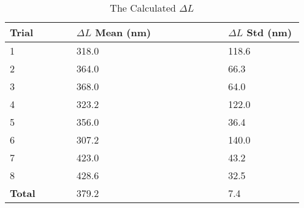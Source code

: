 \begin{table}[htbp]
\centering
\caption{The Calculated $\Delta L$} 
\label{tab:fsr}
\begin{tabular}{|p{0.22\linewidth}|p{0.5\linewidth}|p{0.25\linewidth}|}
\hline
\textbf{Trial}
&
\textbf{$\Delta L$ Mean (nm)}
&
\textbf{$\Delta L$ Std (nm)}
\\
\hline
1
&
318.0
&
118.6
\\
\hline
2
&
364.0
&
66.3
\\
\hline
3
&
368.0
&
64.0
\\
\hline 
4
&
323.2
&
122.0
\\
\hline 
5
&
356.0
&
36.4
\\
\hline 
6
&
307.2
&
140.0
\\
\hline 
7
&
423.0
&
43.2
\\
\hline
8
&
428.6
&
32.5
\\
\hline
\textbf{Total}
&
379.2
&
7.4
\\
\hline
\end{tabular}
\end{table}